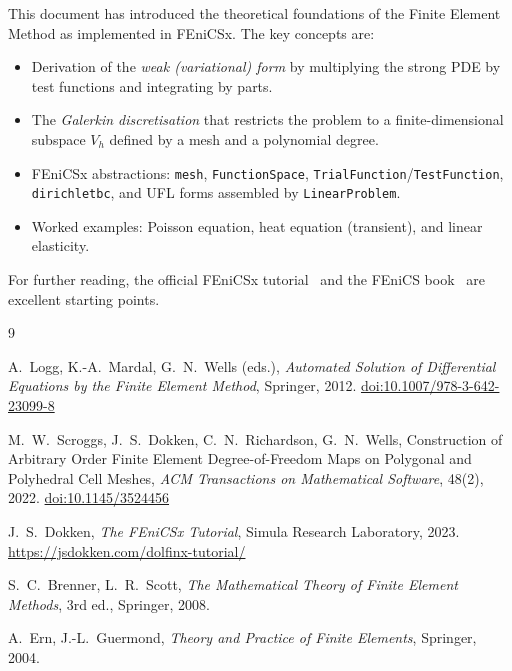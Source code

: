 \documentclass[11pt]{article}
\begin{document}
This document has introduced the theoretical foundations of the Finite Element
Method as implemented in FEniCSx.
The key concepts are:
\begin{itemize}
  \item Derivation of the \emph{weak (variational) form} by multiplying the
    strong PDE by test functions and integrating by parts.
  \item The \emph{Galerkin discretisation} that restricts the problem to a
    finite-dimensional subspace $V_h$ defined by a mesh and a polynomial degree.
  \item FEniCSx abstractions: \texttt{mesh}, \texttt{FunctionSpace},
    \texttt{TrialFunction}/\texttt{TestFunction}, \texttt{dirichletbc},
    and UFL forms assembled by \texttt{LinearProblem}.
  \item Worked examples: Poisson equation, heat equation (transient),
    and linear elasticity.
\end{itemize}

For further reading, the official FEniCSx tutorial~\cite{Dokken2023} and
the FEniCS book~\cite{LoggMardalWells2012} are excellent starting points.

\begin{thebibliography}{9}

  A.~Logg, K.-A.~Mardal, G.~N.~Wells (eds.),
  \textit{Automated Solution of Differential Equations by the Finite Element Method},
  Springer, 2012.
  \href{https://doi.org/10.1007/978-3-642-23099-8}{doi:10.1007/978-3-642-23099-8}

  M.~W.~Scroggs, J.~S.~Dokken, C.~N.~Richardson, G.~N.~Wells,
  Construction of Arbitrary Order Finite Element Degree-of-Freedom Maps on
  Polygonal and Polyhedral Cell Meshes,
  \textit{ACM Transactions on Mathematical Software}, 48(2), 2022.
  \href{https://doi.org/10.1145/3524456}{doi:10.1145/3524456}

  J.~S.~Dokken,
  \textit{The FEniCSx Tutorial},
  Simula Research Laboratory, 2023.
  \url{https://jsdokken.com/dolfinx-tutorial/}

  S.~C.~Brenner, L.~R.~Scott,
  \textit{The Mathematical Theory of Finite Element Methods},
  3rd ed., Springer, 2008.

  A.~Ern, J.-L.~Guermond,
  \textit{Theory and Practice of Finite Elements},
  Springer, 2004.

\end{thebibliography}
\end{document}
